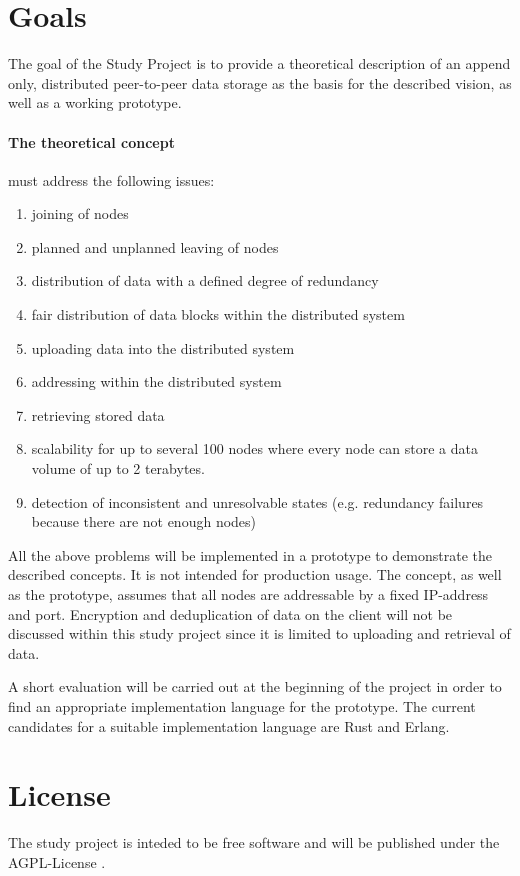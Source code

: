 \documentclass[a4paper]{article}
\begin{document}
\section{Goals}

The goal of the Study Project is to provide a theoretical description of an append only, distributed peer-to-peer data storage as the basis for the described vision, as well as a working prototype.

\paragraph{The theoretical concept} must address the following issues:

\begin{enumerate}[label=\alph*.]
\item joining of nodes
\item planned and unplanned leaving of nodes
\item distribution of data with a defined degree of redundancy
\item fair distribution of data blocks within the distributed system
\item uploading data into the distributed system
\item addressing within the distributed system
\item retrieving stored data
\item scalability for up to several 100 nodes where every node can store a data volume of up to 2 terabytes.
\item detection of inconsistent and unresolvable states (e.g. redundancy failures because there are not enough nodes)	
\end{enumerate}

All the above problems will be implemented in a prototype to demonstrate the described concepts. It is not intended for production usage.
The concept, as well as the prototype, assumes that all nodes are addressable by a fixed IP-address and port.
Encryption and deduplication of data on the client will not be discussed within this study project since it is limited to uploading and retrieval of data.

A short evaluation will be carried out at the beginning of the project in order to find an appropriate implementation language for the prototype. The current candidates for a suitable implementation language are Rust and Erlang.

\section{License}
The study project is inteded to be free software and will be published under the AGPL-License \cite{agplv3}.
\end{document}
